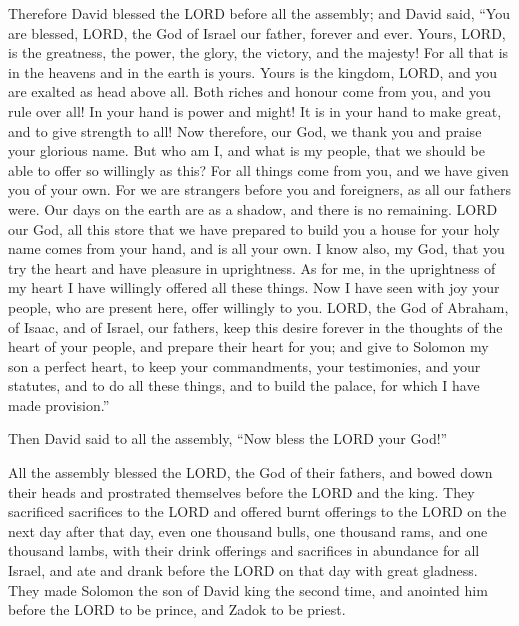  Therefore David blessed the LORD before all the
assembly; and David said, ``You are blessed, LORD, the God of Israel our
father, forever and ever.  Yours, LORD, is the greatness,
the power, the glory, the victory, and the majesty! For all that is in
the heavens and in the earth is yours. Yours is the kingdom, LORD, and
you are exalted as head above all.  Both riches and
honour come from you, and you rule over all! In your hand is power and
might! It is in your hand to make great, and to give strength to all!
 Now therefore, our God, we thank you and praise your
glorious name.  But who am I, and what is my people, that
we should be able to offer so willingly as this? For all things come
from you, and we have given you of your own.  For we are
strangers before you and foreigners, as all our fathers were. Our days
on the earth are as a shadow, and there is no remaining. 
LORD our God, all this store that we have prepared to build you a house
for your holy name comes from your hand, and is all your own.
 I know also, my God, that you try the heart and have
pleasure in uprightness. As for me, in the uprightness of my heart I
have willingly offered all these things. Now I have seen with joy your
people, who are present here, offer willingly to you. 
LORD, the God of Abraham, of Isaac, and of Israel, our fathers, keep
this desire forever in the thoughts of the heart of your people, and
prepare their heart for you;  and give to Solomon my son
a perfect heart, to keep your commandments, your testimonies, and your
statutes, and to do all these things, and to build the palace, for which
I have made provision.''

 Then David said to all the assembly, ``Now bless the
LORD your God!''

All the assembly blessed the LORD, the God of their fathers, and bowed
down their heads and prostrated themselves before the LORD and the king.
 They sacrificed sacrifices to the LORD and offered burnt
offerings to the LORD on the next day after that day, even one thousand
bulls, one thousand rams, and one thousand lambs, with their drink
offerings and sacrifices in abundance for all Israel, 
and ate and drank before the LORD on that day with great gladness. They
made Solomon the son of David king the second time, and anointed him
before the LORD to be prince, and Zadok to be priest.

